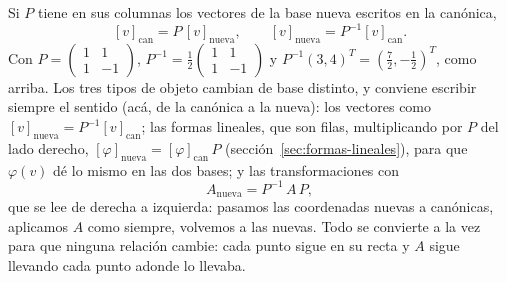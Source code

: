 \begin{resultado}
Si \(P\) tiene en sus columnas los vectores de la base nueva escritos en la canónica,
\[
  [v]_{\text{can}}=P\,[v]_{\text{nueva}},\qquad [v]_{\text{nueva}}=P^{-1}[v]_{\text{can}} .
\]
Con \(P=\begin{pmatrix}1&1\\1&-1\end{pmatrix}\), \(P^{-1}=\tfrac12\begin{pmatrix}1&1\\1&-1\end{pmatrix}\)
y \(P^{-1}(3,4)^T=(\tfrac72,-\tfrac12)^T\), como arriba. Los tres tipos de objeto cambian
de base distinto, y conviene escribir siempre el sentido (acá, de la canónica a la nueva):
los vectores como \([v]_{\text{nueva}}=P^{-1}[v]_{\text{can}}\); las formas lineales, que
son filas, multiplicando por \(P\) del lado derecho, \([\varphi]_{\text{nueva}}=[\varphi]_{\text{can}}\,P\)
(sección~\ref{sec:formas-lineales}), para que \(\varphi(v)\) dé lo mismo en las dos bases;
y las transformaciones con
\[
  A_{\text{nueva}}=P^{-1}\,A\,P ,
\]
que se lee de derecha a izquierda: pasamos las coordenadas nuevas a canónicas, aplicamos \(A\)
como siempre, volvemos a las nuevas. Todo se convierte a la vez para que ninguna relación
cambie: cada punto sigue en su recta y \(A\) sigue llevando cada punto adonde lo llevaba.
\end{resultado}

